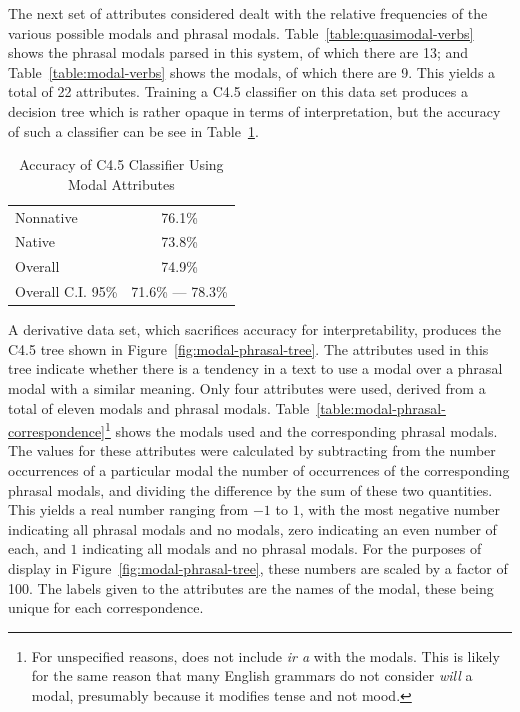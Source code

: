 \documentclass[main.tex]{subfiles}
\begin{document}
The next set of attributes considered dealt with the relative frequencies of the various possible modals and phrasal modals. Table~\ref{table:quasimodal-verbs} shows the phrasal modals parsed in this system, of which there are 13; and Table~\ref{table:modal-verbs} shows the modals, of which there are 9. This yields a total of 22 attributes. Training a C4.5 classifier on this data set produces a decision tree which is rather opaque in terms of interpretation, but the accuracy of such a classifier can be see in Table~\ref{table:modal-attributes-results}. 
\begin{table}[htbp]
\centering
\caption{Accuracy of C4.5 Classifier Using Modal Attributes}
\begin{tabular}{l c}
\toprule
Nonnative & 76.1\% \\
Native & 73.8\% \\
Overall & 74.9\% \\
Overall C.I. 95\% & 71.6\% --- 78.3\%\\
\bottomrule
\end{tabular}
\label{table:modal-attributes-results}
\end{table}
A derivative data set, which sacrifices accuracy for interpretability, produces the C4.5 tree shown in Figure~\ref{fig:modal-phrasal-tree}. The attributes used in this tree indicate whether there is a tendency in a text to use a modal over a phrasal modal with a similar meaning. Only four attributes were used, derived from a total of eleven modals and phrasal modals. Table~\ref{table:modal-phrasal-correspondence}\footnote{For unspecified reasons, \citet{butt} does not include \textit{ir a} with the modals. This is likely for the same reason that many English grammars do not consider \textit{will} a modal, presumably because it modifies tense and not mood.} shows the modals used and the corresponding phrasal modals. The values for these attributes were calculated by subtracting from the number occurrences of a particular modal the number of occurrences of the corresponding phrasal modals, and dividing the difference by the sum of these two quantities. This yields a real number ranging from $-1$ to $1$, with the most negative number indicating all phrasal modals and no modals, zero indicating an even number of each, and $1$ indicating all modals and no phrasal modals. For the purposes of display in Figure~\ref{fig:modal-phrasal-tree}, these numbers are scaled by a factor of 100. The labels given to the attributes are the names of the modal, these being unique for each correspondence.
\end{document}
